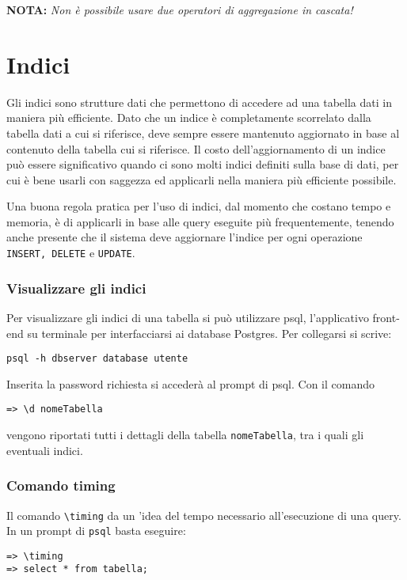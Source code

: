 \documentclass[a4paper, 10pt, titlepage]{article}
\begin{document}
		\noindent
		\textbf{NOTA: } \textit{Non è possibile usare due operatori di aggregazione in cascata!}
	\newpage		
	\section{Indici}
	Gli indici sono strutture dati che permettono di accedere ad una tabella dati in maniera più efficiente. Dato che un indice è completamente scorrelato dalla tabella dati a cui si riferisce, deve sempre essere mantenuto aggiornato in base al contenuto della tabella cui si riferisce. Il costo dell'aggiornamento di un indice può essere significativo quando ci sono molti indici definiti sulla base di dati, per cui è bene usarli con saggezza ed applicarli nella maniera più efficiente possibile.
	
	Una buona regola pratica per l'uso di indici, dal momento che costano tempo e memoria, è di applicarli in base alle query eseguite più frequentemente, tenendo anche presente che il sistema deve aggiornare l'indice per ogni operazione \lstinline|INSERT, DELETE| e \lstinline|UPDATE|.
	
	\subsubsection*{Visualizzare gli indici}
	Per visualizzare gli indici di una tabella si può utilizzare psql, l'applicativo front-end su terminale per interfacciarsi ai database Postgres. Per collegarsi si scrive:
	\begin{lstlisting}
psql -h dbserver database utente
	\end{lstlisting}
	Inserita la password richiesta si accederà al prompt di psql. Con il comando
	\begin{lstlisting}
=> \d nomeTabella
	\end{lstlisting}
	vengono riportati tutti i dettagli della tabella \lstinline|nomeTabella|, tra i quali gli eventuali indici.
	
	\subsubsection*{Comando timing}
	Il comando \lstinline|\timing| da un 'idea del tempo necessario all'esecuzione di una query.
	In un prompt di \verb|psql| basta eseguire:
	\begin{lstlisting}
=> \timing
=> select * from tabella;
	\end{lstlisting}
\end{document}

